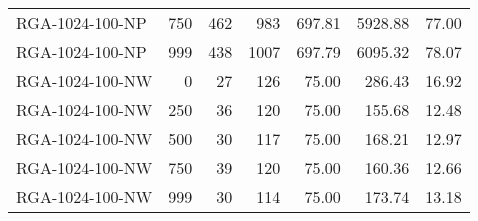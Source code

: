 \begin{table}[htbp]
{\begin{tabular}{lrrrrrr}
    RGA-1024-100-NP & 750    & 462    & 983    & 697.81 & 5928.88 & 77.00 \\
    RGA-1024-100-NP & 999    & 438    & 1007   & 697.79 & 6095.32 & 78.07 \\ \hline
    RGA-1024-100-NW & 0      & 27     & 126    & 75.00  & 286.43 & 16.92 \\
    RGA-1024-100-NW & 250    & 36     & 120    & 75.00  & 155.68 & 12.48 \\
    RGA-1024-100-NW & 500    & 30     & 117    & 75.00  & 168.21 & 12.97 \\
    RGA-1024-100-NW & 750    & 39     & 120    & 75.00  & 160.36 & 12.66 \\
    RGA-1024-100-NW & 999    & 30     & 114    & 75.00  & 173.74 & 13.18 \\
    \bottomrule
    \end{tabular}}
  \label{tab:addlabel}%
\end{table}%
